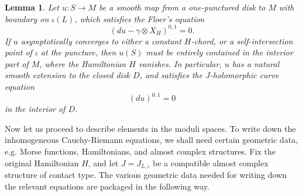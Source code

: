 \documentclass{amsart}
\newtheorem{lemma}[theorem]{Lemma}
\numberwithin{equation}{section}
\numberwithin{figure}{section}
\begin{document}
\begin{lemma}
	Let $u: S \to M$ be a smooth map from a one-punctured disk to $M$ with boundary on $\iota(L)$, which satisfies the Floer's equation
\begin{equation}
(du - \gamma \otimes X_{H})^{0, 1} = 0.
\end{equation}
If $u$ asymptotically converges to either a constant $H$-chord, or a self-intersection point of $\iota$ at the puncture, then $u(S)$ must be entirely contained in the interior part of $M$, where the Hamiltonian $H$ vanishes. In particular, $u$ has a natural smooth extension to the closed disk $D$, and satisfies the $J$-holomorphic curve equation
\begin{equation}
(du)^{0, 1} = 0
\end{equation}
in the interior of $D$.
\end{lemma}

	Now let us proceed to describe elements in the moduli spaces. To write down the inhomogeneous Cauchy-Riemann equations, we shall need certain geometric data, e.g. Morse functions, Hamiltonians, and almost complex structures. Fix the original Hamiltonian $H$, and let $J = J_{L, \iota}$ be a compatible almost complex structure of contact type. The various geometric data needed for writing down the relevant equations are packaged in the following way. \par
\end{document}
